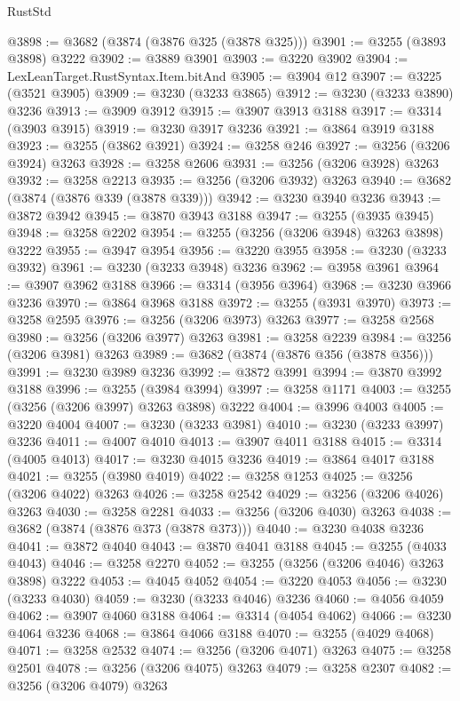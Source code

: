 \begin{lexlean}{RustStd}
\begin{coremodule}
{\begin{coremodule}
{{{{{{{{{{{{{{{{{{{{{{{{{{{{{{{{{{{{{@3898 := @3682 (@3874 (@3876 @325 (@3878 @325)))
@3901 := @3255 (@3893 @3898) @3222
@3902 := @3889 @3901
@3903 := @3220 @3902
@3904 := LexLeanTarget.RustSyntax.Item.bitAnd
@3905 := @3904 @12
@3907 := @3225 (@3521 @3905)
@3909 := @3230 (@3233 @3865)
@3912 := @3230 (@3233 @3890) @3236
@3913 := @3909 @3912
@3915 := @3907 @3913 @3188
@3917 := @3314 (@3903 @3915)
@3919 := @3230 @3917 @3236
@3921 := @3864 @3919 @3188
@3923 := @3255 (@3862 @3921)
@3924 := @3258 @246
@3927 := @3256 (@3206 @3924) @3263
@3928 := @3258 @2606
@3931 := @3256 (@3206 @3928) @3263
@3932 := @3258 @2213
@3935 := @3256 (@3206 @3932) @3263
@3940 := @3682 (@3874 (@3876 @339 (@3878 @339)))
@3942 := @3230 @3940 @3236
@3943 := @3872 @3942
@3945 := @3870 @3943 @3188
@3947 := @3255 (@3935 @3945)
@3948 := @3258 @2202
@3954 := @3255 (@3256 (@3206 @3948) @3263 @3898) @3222
@3955 := @3947 @3954
@3956 := @3220 @3955
@3958 := @3230 (@3233 @3932)
@3961 := @3230 (@3233 @3948) @3236
@3962 := @3958 @3961
@3964 := @3907 @3962 @3188
@3966 := @3314 (@3956 @3964)
@3968 := @3230 @3966 @3236
@3970 := @3864 @3968 @3188
@3972 := @3255 (@3931 @3970)
@3973 := @3258 @2595
@3976 := @3256 (@3206 @3973) @3263
@3977 := @3258 @2568
@3980 := @3256 (@3206 @3977) @3263
@3981 := @3258 @2239
@3984 := @3256 (@3206 @3981) @3263
@3989 := @3682 (@3874 (@3876 @356 (@3878 @356)))
@3991 := @3230 @3989 @3236
@3992 := @3872 @3991
@3994 := @3870 @3992 @3188
@3996 := @3255 (@3984 @3994)
@3997 := @3258 @1171
@4003 := @3255 (@3256 (@3206 @3997) @3263 @3898) @3222
@4004 := @3996 @4003
@4005 := @3220 @4004
@4007 := @3230 (@3233 @3981)
@4010 := @3230 (@3233 @3997) @3236
@4011 := @4007 @4010
@4013 := @3907 @4011 @3188
@4015 := @3314 (@4005 @4013)
@4017 := @3230 @4015 @3236
@4019 := @3864 @4017 @3188
@4021 := @3255 (@3980 @4019)
@4022 := @3258 @1253
@4025 := @3256 (@3206 @4022) @3263
@4026 := @3258 @2542
@4029 := @3256 (@3206 @4026) @3263
@4030 := @3258 @2281
@4033 := @3256 (@3206 @4030) @3263
@4038 := @3682 (@3874 (@3876 @373 (@3878 @373)))
@4040 := @3230 @4038 @3236
@4041 := @3872 @4040
@4043 := @3870 @4041 @3188
@4045 := @3255 (@4033 @4043)
@4046 := @3258 @2270
@4052 := @3255 (@3256 (@3206 @4046) @3263 @3898) @3222
@4053 := @4045 @4052
@4054 := @3220 @4053
@4056 := @3230 (@3233 @4030)
@4059 := @3230 (@3233 @4046) @3236
@4060 := @4056 @4059
@4062 := @3907 @4060 @3188
@4064 := @3314 (@4054 @4062)
@4066 := @3230 @4064 @3236
@4068 := @3864 @4066 @3188
@4070 := @3255 (@4029 @4068)
@4071 := @3258 @2532
@4074 := @3256 (@3206 @4071) @3263
@4075 := @3258 @2501
@4078 := @3256 (@3206 @4075) @3263
@4079 := @3258 @2307
@4082 := @3256 (@3206 @4079) @3263
}}}}}}}}}}}}}}}}}}}}}}}}}}}}}}}}}}}}}
\end{coremodule}}
\end{coremodule}
\end{lexlean}
